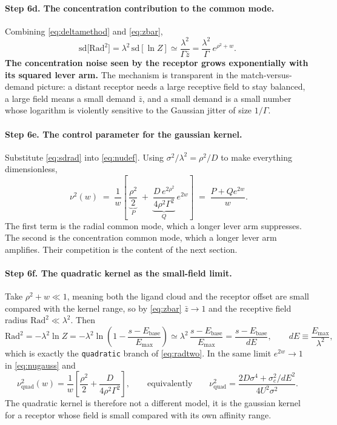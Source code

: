 \documentclass[11pt,a4paper]{article}
\newcommand{\sd}{\mathrm{sd}}
\newcommand{\Ebase}{E_{\mathrm{base}}}
\newcommand{\Emax}{E_{\mathrm{max}}}
\begin{document}
\paragraph{Step 6d. The concentration contribution to the common mode.} Combining
\eqref{eq:deltamethod} and \eqref{eq:zbar},
\begin{equation}
  \sd\big[\mathrm{Rad}^2\big] = \lambda^2\,\sd[\ln Z]
   \simeq \frac{\lambda^2}{\Gamma\bar z}
   = \frac{\lambda^2}{\Gamma}\,e^{\rho^2+w}.
  \label{eq:sdrad}
\end{equation}
\textbf{The concentration noise seen by the receptor grows exponentially with its
squared lever arm.} The mechanism is transparent in the match-versus-demand picture: a
distant receptor needs a large receptive field to stay balanced, a large field means a
small demand $\bar z$, and a small demand is a small number whose logarithm is violently
sensitive to the Gaussian jitter of size $1/\Gamma$.

\paragraph{Step 6e. The control parameter for the gaussian kernel.} Substitute
\eqref{eq:sdrad} into \eqref{eq:nudef}. Using $\sigma^2/\lambda^2=\rho^2/D$ to make
everything dimensionless,
\begin{equation}
  \boxed{\;\nu^2(w) \;=\; \frac{1}{w}\left[\,\underbrace{\frac{\rho^2}{2}}_{\textstyle P}
   \;+\; \underbrace{\frac{D\,e^{2\rho^2}}{4\rho^2\Gamma^2}}_{\textstyle Q}\,e^{2w}\right]
   \;=\; \frac{P+Qe^{2w}}{w} . }
  \label{eq:nugauss}
\end{equation}
The first term is the radial common mode, which a longer lever arm suppresses. The
second is the concentration common mode, which a longer lever arm amplifies. Their
competition is the content of the next section.

\paragraph{Step 6f. The quadratic kernel as the small-field limit.} Take
$\rho^2+w\ll 1$, meaning both the ligand cloud and the receptor offset are small
compared with the kernel range, so by \eqref{eq:zbar} $\bar z\to 1$ and the receptive
field radius $\mathrm{Rad}^2 \ll \lambda^2$. Then
\begin{equation}
  \mathrm{Rad}^2 = -\lambda^2\ln Z
   = -\lambda^2\ln\!\left(1-\frac{s-\Ebase}{\Emax}\right)
   \simeq \lambda^2\,\frac{s-\Ebase}{\Emax}
   = \frac{s-\Ebase}{dE},
   \qquad dE \equiv \frac{\Emax}{\lambda^2},
\end{equation}
which is exactly the \texttt{quadratic} branch of \eqref{eq:radtwo}. In the same limit
$e^{2w}\to1$ in \eqref{eq:nugauss} and
\begin{equation}
  \nu^2_{\text{quad}}(w) = \frac{1}{w}\left[\frac{\rho^2}{2}+\frac{D}{4\rho^2\Gamma^2}\right],
  \qquad\text{equivalently}\qquad
  \nu^2_{\text{quad}} = \frac{2D\sigma^4 + \sigma_c^2/dE^2}{4U^2\sigma^2}.
  \label{eq:nuquad}
\end{equation}
The quadratic kernel is therefore not a different model, it is the gaussian kernel for a
receptor whose field is small compared with its own affinity range.
\end{document}
